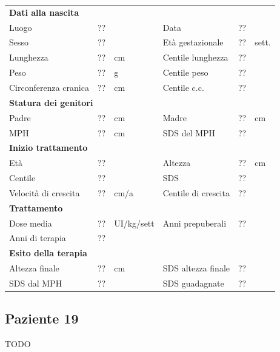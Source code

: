 \begin{table}[!h]
\begin{tabular}{lrllrl}
\toprule
\multicolumn{6}{l}{\textbf{Dati alla nascita}}\\
Luogo 		& \multicolumn{2}{l}{??} 	& Data 					& \multicolumn{2}{l}{??} 	\\
Sesso 		& \multicolumn{2}{l}{??} 	& Età gestazionale 		& ?? 		& sett.\\
Lunghezza 	& ?? 		& cm 				& Centile lunghezza		& ?? 		\\
Peso 		& ?? 		& g					& Centile peso			& ?? 		\\
Circonferenza cranica	& ?? 		& cm 	& Centile c.c.			& ?? \\
\midrule
\multicolumn{6}{l}{\textbf{Statura dei genitori}}\\
Padre 		& ?? & cm 	& Madre 				& ?? & cm \\
MPH 		& ?? & cm 	& SDS del MPH 			& ??\\
\midrule
\multicolumn{6}{l}{\textbf{Inizio trattamento}} \\
Età	& ?? & 		& Altezza 				& ?? & cm  \\
Centile & ?? 	 &		& SDS		& ?? \\
Velocità di crescita & ?? & cm/a	& Centile di crescita & ??\\
\midrule
\multicolumn{6}{l}{\textbf{Trattamento}} \\
Dose media		& ?? & UI/kg/sett & Anni prepuberali & ??\\
Anni di terapia & ??\\
\midrule
\multicolumn{6}{l}{\textbf{Esito della terapia}} \\
Altezza finale			& ?? & cm 	& SDS altezza finale		& ??\\
SDS dal MPH				& ?? &		& SDS guadagnate 			& ??\\
\bottomrule
\end{tabular}
\end{table}
\clearpage


\subsection*{Paziente 19}

TODO

